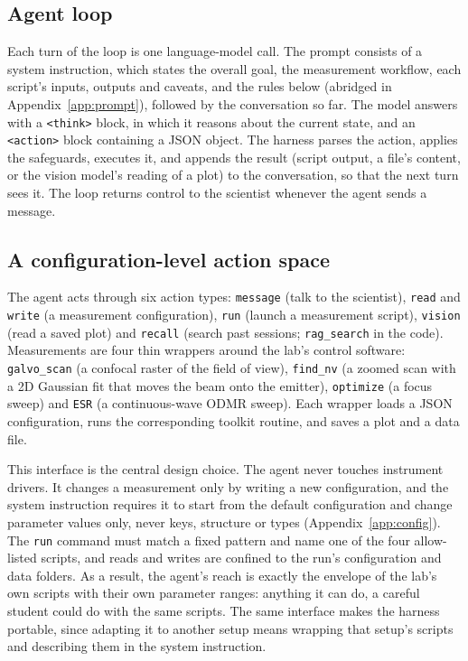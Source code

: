 \documentclass[10pt]{article}
\newcommand{\code}[1]{\texttt{#1}}
\begin{document}
\subsection{Agent loop}
\label{sec:loop}
Each turn of the loop is one language-model call.
The prompt consists of a system instruction, which states the overall goal, the measurement workflow, each script's inputs, outputs and caveats, and the rules below (abridged in Appendix~\ref{app:prompt}), followed by the conversation so far.
The model answers with a \code{<think>} block, in which it reasons about the current state, and an \code{<action>} block containing a JSON object.
The harness parses the action, applies the safeguards, executes it, and appends the result (script output, a file's content, or the vision model's reading of a plot) to the conversation, so that the next turn sees it.
The loop returns control to the scientist whenever the agent sends a message.

\subsection{A configuration-level action space}
\label{sec:actions}
The agent acts through six action types: \code{message} (talk to the scientist), \code{read} and \code{write} (a measurement configuration), \code{run} (launch a measurement script), \code{vision} (read a saved plot) and \code{recall} (search past sessions; \code{rag\_search} in the code).
Measurements are four thin wrappers around the lab's control software: \code{galvo\_scan} (a confocal raster of the field of view), \code{find\_nv} (a zoomed scan with a 2D Gaussian fit that moves the beam onto the emitter), \code{optimize} (a focus sweep) and \code{ESR} (a continuous-wave ODMR sweep).
Each wrapper loads a JSON configuration, runs the corresponding toolkit routine, and saves a plot and a data file.

This interface is the central design choice.
The agent never touches instrument drivers.
It changes a measurement only by writing a new configuration, and the system instruction requires it to start from the default configuration and change parameter values only, never keys, structure or types (Appendix~\ref{app:config}).
The \code{run} command must match a fixed pattern and name one of the four allow-listed scripts, and reads and writes are confined to the run's configuration and data folders.
As a result, the agent's reach is exactly the envelope of the lab's own scripts with their own parameter ranges: anything it can do, a careful student could do with the same scripts.
The same interface makes the harness portable, since adapting it to another setup means wrapping that setup's scripts and describing them in the system instruction.
\end{document}
